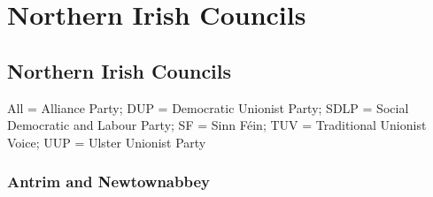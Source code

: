 \part{Northern Irish Councils}

\chapter{Northern Irish Councils}

{\footnotesize
All = Alliance Party; DUP = Democratic Unionist Party; SDLP = Social Democratic and Labour Party; SF = Sinn F\'ein; TUV = Traditional Unionist Voice; UUP = Ulster Unionist Party

}

\section{Antrim and Newtownabbey}

